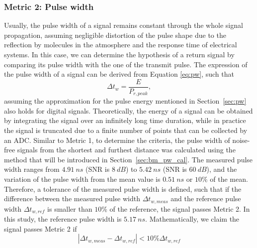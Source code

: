 \subsubsection{Metric 2: Pulse width}
Usually, the pulse width of a signal remains constant through the whole signal propagation, assuming negligible distortion of the pulse shape due to the reflection by molecules in the atmosphere and the response time of electrical systems. In this case, we can determine the hypothesis of a return signal by comparing its pulse width with the one of the transmit pulse. The expression of the pulse width of a signal can be derived from Equation \eqref{eq:pw}, such that
\begin{equation} \label{eq:bm_pw}
    \Delta t_w = \frac{E}{P_{r, peak}},
\end{equation}
assuming the approximation for the pulse energy mentioned in Section~\ref{sec:pw} also holds for digital signals. Theoretically, the energy of a signal can be obtained by integrating the signal over an infinitely long time duration, while in practice the signal is truncated due to a finite number of points that can be collected by an ADC. Similar to Metric 1, to determine the criteria, the pulse width of noise-free signals from the shortest and furthest distance was calculated using the method that will be introduced in Section~\ref{sec:bm_pw_cal}. The measured pulse width ranges from $4.91~ns$ (SNR is $8~dB$) to $5.42~ns$ (SNR is $60~dB$), and the variation of the pulse width from the mean value is $0.51~ns$ or $10\%$ of the mean. Therefore, a tolerance of the measured pulse width is defined, such that if the difference between the measured pulse width $\Delta t_{w,meas}$ and the reference pulse width $\Delta t_{w,ref}$ is smaller than $10\%$ of the reference, the signal passes Metric 2. In this study, the reference pulse width is $5.17~ns$. Mathematically, we claim the signal passes Metric 2 if
\begin{equation}\label{eq:bm_cri2}
    |\Delta t_{w, meas} - \Delta t_{w,ref}| < 10\%\Delta t_{w,ref}
\end{equation}\par
